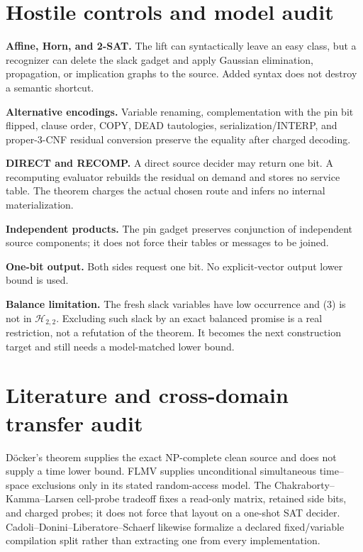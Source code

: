 \documentclass[11pt]{article}
\begin{document}
\section{Hostile controls and model audit}

\begin{description}[leftmargin=0cm,labelwidth=0cm]
\item[] \textbf{Affine, Horn, and 2-SAT.}
The lift can syntactically leave an easy class, but a recognizer can delete
the slack gadget and apply Gaussian elimination, propagation, or implication
graphs to the source.  Added syntax does not destroy a semantic shortcut.
\item[] \textbf{Alternative encodings.}
Variable renaming, complementation with the pin bit flipped, clause order,
COPY, DEAD tautologies, serialization/INTERP, and proper-3-CNF residual
conversion preserve the equality after charged decoding.
\item[] \textbf{DIRECT and RECOMP.}
A direct source decider may return one bit.  A recomputing evaluator rebuilds
the residual on demand and stores no service table.  The theorem charges the
actual chosen route and infers no internal materialization.
\item[] \textbf{Independent products.}
The pin gadget preserves conjunction of independent source components; it
does not force their tables or messages to be joined.
\item[] \textbf{One-bit output.}
Both sides request one bit.  No explicit-vector output lower bound is used.
\item[] \textbf{Balance limitation.}
The fresh slack variables have low occurrence and (3) is not in
$\mathcal H_{2,2}$.  Excluding such slack by an exact balanced promise is a
real restriction, not a refutation of the theorem.  It becomes the next
construction target and still needs a model-matched lower bound.
\end{description}

\section{Literature and cross-domain transfer audit}

D\"ocker's theorem supplies the exact NP-complete clean source and does not
supply a time lower bound.  FLMV supplies unconditional simultaneous
time--space exclusions only in its stated random-access model.  The
Chakraborty--Kamma--Larsen cell-probe tradeoff fixes a read-only matrix,
retained side bits, and charged probes; it does not force that layout on a
one-shot SAT decider.  Cadoli--Donini--Liberatore--Schaerf likewise formalize
a declared fixed/variable compilation split rather than extracting one from
every implementation.
\end{document}
